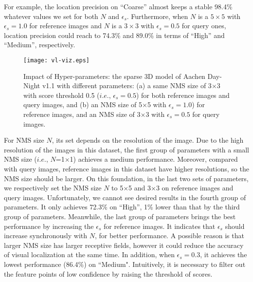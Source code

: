 \documentclass[journal]{IEEEtran}
\begin{document}
For example, the location precision on ``Coarse'' almost keeps a stable 98.4\% whatever values we set for both $N$ and $\epsilon_s$. Furthermore, when $N$ is a $5\times5$ with $\epsilon_s=1.0$ for reference images and $N$ is a $3\times3$ with $\epsilon_s=0.5$ for query ones, location precision could reach to 74.3\% and 89.0\% in terms of ``High'' and ``Medium'', respectively. 


\begin{figure}[h]
\centering
\texttt{[image: vl-viz.eps]}
\caption{
Impact of Hyper-parameters: the sparse 3D model of Aachen Day-Night v1.1 with different parameters: (a) a same NMS size of 3$\times$3 with score threshold 0.5 ($i.e.$, $\epsilon_{s}= 0.5$) for both reference images and query images, and (b) an NMS size of 5$\times$5 with $\epsilon_{s}= 1.0$) for reference images, and an NMS size of 3$\times$3 with $\epsilon_{s}= 0.5$ for query images.
}
\label{fig9}
\end{figure}

For NMS size $N$, its set depends on the resolution of the image. Due to the high resolution of the images in this dataset, the first group of parameters with a small NMS size ($i.e.$, $N$=1$\times$1) achieves a medium performance. 
Moreover, compared with query images, reference images in this dataset have higher resolutions, so the NMS size should be larger. On this foundation, in the last two sets of parameters, we respectively set the NMS size $N$ to 5$\times$5 and 3$\times$3 on reference images and query images. 
Unfortunately, we cannot see desired results in the fourth group of parameters. It only achieves 72.3\% on ``High'', 1\% lower than that by the third group of parameters. 
Meanwhile, the last group of parameters brings the best performance by increasing the $\epsilon_s$ for reference images. 
It indicates that $\epsilon_s$ should increase synchronously with $N$, for better performance. A possible reason is that larger NMS size has larger receptive fields, however it could reduce the accuracy of visual localization at the same time. In addition, when $\epsilon_s=0.3$, it achieves the lowest performance (86.4\%) on ``Medium". Intuitively, it is necessary to filter out the feature points of low confidence by raising the threshold of scores.
\end{document}
